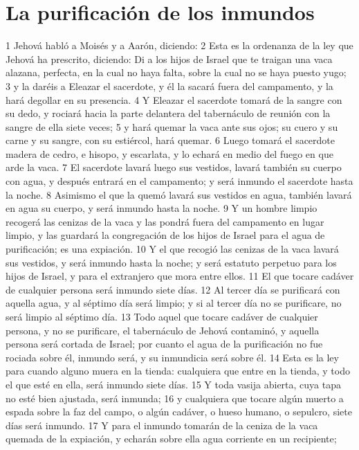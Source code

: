 \section*{La purificación de los inmundos}


1 Jehová habló a Moisés y a Aarón, diciendo:
2 Esta es la ordenanza de la ley que Jehová ha prescrito, diciendo: Di a los hijos de Israel que te traigan una vaca alazana, perfecta, en la cual no haya falta, sobre la cual no se haya puesto yugo;
3 y la daréis a Eleazar el sacerdote, y él la sacará fuera del campamento, y la hará degollar en su presencia.
4 Y Eleazar el sacerdote tomará de la sangre con su dedo, y rociará hacia la parte delantera del tabernáculo de reunión con la sangre de ella siete veces;
5 y hará quemar la vaca ante sus ojos; su cuero y su carne y su sangre, con su estiércol, hará quemar.
6 Luego tomará el sacerdote madera de cedro, e hisopo, y escarlata, y lo echará en medio del fuego en que arde la vaca.
7 El sacerdote lavará luego sus vestidos, lavará también su cuerpo con agua, y después entrará en el campamento; y será inmundo el sacerdote hasta la noche.
8 Asimismo el que la quemó lavará sus vestidos en agua, también lavará en agua su cuerpo, y será inmundo hasta la noche.
9 Y un hombre limpio recogerá las cenizas de la vaca y las pondrá fuera del campamento en lugar limpio, y las guardará la congregación de los hijos de Israel para el agua de purificación; es una expiación.
10 Y el que recogió las cenizas de la vaca lavará sus vestidos, y será inmundo hasta la noche; y será estatuto perpetuo para los hijos de Israel, y para el extranjero que mora entre ellos.
11 El que tocare cadáver de cualquier persona será inmundo siete días.
12 Al tercer día se purificará con aquella agua, y al séptimo día será limpio; y si al tercer día no se purificare, no será limpio al séptimo día.
13 Todo aquel que tocare cadáver de cualquier persona, y no se purificare, el tabernáculo de Jehová contaminó, y aquella persona será cortada de Israel; por cuanto el agua de la purificación no fue rociada sobre él, inmundo será, y su inmundicia será sobre él.
14 Esta es la ley para cuando alguno muera en la tienda: cualquiera que entre en la tienda, y todo el que esté en ella, será inmundo siete días.
15 Y toda vasija abierta, cuya tapa no esté bien ajustada, será inmunda;
16 y cualquiera que tocare algún muerto a espada sobre la faz del campo, o algún cadáver, o hueso humano, o sepulcro, siete días será inmundo.
17 Y para el inmundo tomarán de la ceniza de la vaca quemada de la expiación, y echarán sobre ella agua corriente en un recipiente;
